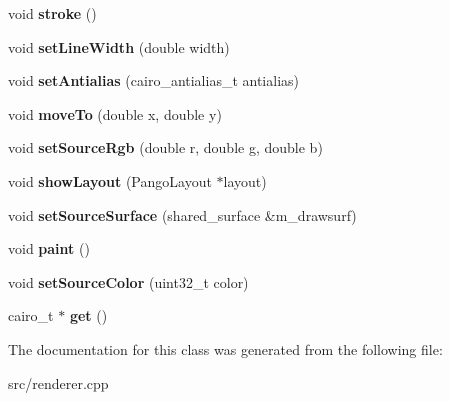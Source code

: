 \begin{DoxyCompactItemize}
void {\bfseries stroke} ()
\item 
\mbox{\label{classContext_a6f3471b0c901fb79d3b0b6fcfc9c7e13}} 
void {\bfseries set\+Line\+Width} (double width)
\item 
\mbox{\label{classContext_a38078c790c2d7ea948393afab2960f32}} 
void {\bfseries set\+Antialias} (cairo\+\_\+antialias\+\_\+t antialias)
\item 
\mbox{\label{classContext_a0840e43c2e120f38b3aeab841a8f1aaf}} 
void {\bfseries move\+To} (double x, double y)
\item 
\mbox{\label{classContext_a420b5b299c1b1e416f66d8f0ae135808}} 
void {\bfseries set\+Source\+Rgb} (double r, double g, double b)
\item 
\mbox{\label{classContext_aafbb8946bc28c3756c2a2cd53d61759d}} 
void {\bfseries show\+Layout} (Pango\+Layout $\ast$layout)
\item 
\mbox{\label{classContext_a0f9eb8fdce717c230d1c90406a6fd6c7}} 
void {\bfseries set\+Source\+Surface} (shared\+\_\+surface \&m\+\_\+drawsurf)
\item 
\mbox{\label{classContext_a0584ad608047efddb1c0ed08e61d1565}} 
void {\bfseries paint} ()
\item 
\mbox{\label{classContext_a11b9abb81539dbda514638ddb3d7001d}} 
void {\bfseries set\+Source\+Color} (uint32\+\_\+t color)
\item 
\mbox{\label{classContext_a9f48cf3fd980e67f5bafb8c0e79fbc13}} 
cairo\+\_\+t $\ast$ {\bfseries get} ()
\end{DoxyCompactItemize}


The documentation for this class was generated from the following file\+:\begin{DoxyCompactItemize}
\item 
src/renderer.\+cpp\end{DoxyCompactItemize}
